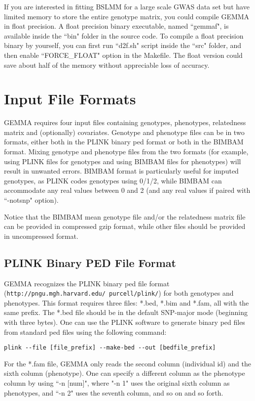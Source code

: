 \documentclass[11pt]{article}
\providecommand{\url}[1]{\texttt{#1}}
\begin{document}
If you are interested in fitting BSLMM for a large scale GWAS data set but have limited memory to store the entire genotype matrix, you could compile GEMMA in float precision. A float precision binary executable, named ``gemmaf",  is available inside the ``bin" folder in the source code. To compile a float precision binary by yourself, you can first run ``d2f.sh" script inside the ``src" folder, and then enable ``FORCE\_FLOAT" option in the Makefile. The float version could save about half of the memory without appreciable loss of accuracy.

\newpage
\section{Input File Formats}
GEMMA requires four input files containing genotypes, phenotypes, relatedness matrix and (optionally) covariates. Genotype and phenotype files can be in two formats, either both in the PLINK binary ped format or both in the BIMBAM format. Mixing genotype and phenotype files from the two formats (for example, using PLINK files for genotypes and using BIMBAM files for phenotypes) will result in unwanted errors. BIMBAM format is particularly useful for imputed genotypes, as PLINK codes genotypes using 0/1/2, while BIMBAM can accommodate any real values between 0 and 2 (and any real values if paired with ``-notsnp" option).

Notice that the BIMBAM mean genotype file and/or the relatedness matrix file can be provided in compressed gzip format, while other files should be provided in uncompressed format.

\subsection{PLINK Binary PED File Format}
GEMMA recognizes the PLINK binary ped file format (\url{http://pngu.mgh.harvard.edu/~purcell/plink/}) \cite{Purcell:2007} for both genotypes and phenotypes. This format requires three files: *.bed, *.bim and *.fam, all with the same prefix. The *.bed file should be in the default SNP-major mode (beginning with three bytes). One can use the PLINK software to generate binary ped files from standard ped files using the following command:
%
\begin{verbatim}
plink --file [file_prefix] --make-bed --out [bedfile_prefix]
\end{verbatim}
%
For the *.fam file, GEMMA only reads the second column (individual id) and the sixth column (phenotype). One can specify a different column as the phenotype column by using ``-n [num]", where "-n 1" uses the original sixth column as phenotypes, and ``-n 2" uses the seventh column, and so on and so forth. 
\end{document}
